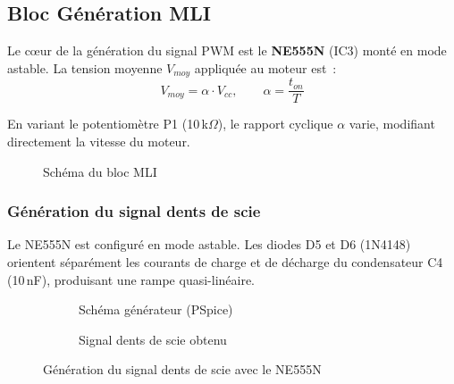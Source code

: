 \documentclass[a4paper,12pt,openany]{book}
\begin{document}
\subsection{Bloc G\'en\'eration MLI}

Le c\oe ur de la g\'en\'eration du signal PWM est le \textbf{NE555N} (IC3)
mont\'e en mode astable. La tension moyenne $V_{moy}$ appliqu\'ee au moteur
est~:
\begin{equation}
  V_{moy} = \alpha \cdot V_{cc}, \qquad \alpha = \frac{t_{on}}{T}
\end{equation}

En variant le potentiom\`etre P1 (10\,k$\Omega$), le rapport cyclique
$\alpha$ varie, modifiant directement la vitesse du moteur.

\begin{figure}[H]
  \centering
  \caption{Sch\'ema du bloc MLI}
  \label{fig:mli_schema}
\end{figure}

\subsubsection{G\'en\'eration du signal dents de scie}

Le NE555N est configur\'e en mode astable. Les diodes D5 et D6 (1N4148)
orientent s\'epar\'ement les courants de charge et de d\'echarge du
condensateur C4 (10\,nF), produisant une rampe quasi-lin\'eaire.

\begin{figure}[H]
  \centering
  \begin{subfigure}[b]{0.52\textwidth}
    \centering
    \caption{Sch\'ema g\'en\'erateur (PSpice)}
  \end{subfigure}
  \hfill
  \begin{subfigure}[b]{0.44\textwidth}
    \centering
    \caption{Signal dents de scie obtenu}
  \end{subfigure}
  \caption{G\'en\'eration du signal dents de scie avec le NE555N}
  \label{fig:dents_scie}
\end{figure}
\end{document}
